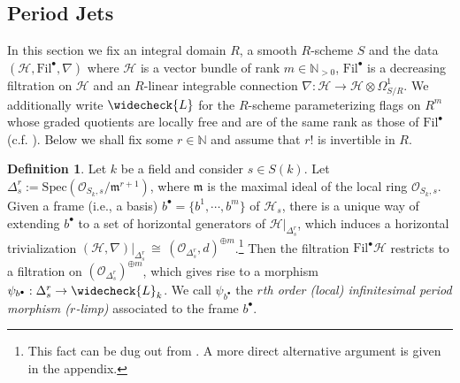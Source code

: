 \documentclass[letter, 11pt]{article}
\theoremstyle{plain}
\theoremstyle{definition}
\newtheorem{definition}[subsubsection]{Definition}
\newcommand{\IN}{\mathbb{N}}
\newcommand{\Spec}{\mathrm{Spec}}
\newcommand{\che}[1]{\widecheck{#1}}
\newcommand\iso{\,{\cong}\,}
\newcommand\tensor{{\otimes}}
\newcommand{\<}{\langle}
\renewcommand{\>}{\rangle}
\newcommand{\sH}{\mathcal{H}}
\newcommand{\sO}{\mathcal{O}}
\newcommand{\Fil}{\mathrm{Fil}}
\newcommand{\fm}{\mathfrak{m}}
\begin{document}
\subsection{Period Jets}
\label{sec: period jets}

In this section we fix an integral domain $R$, a smooth $R$-scheme $S$ and the data $(\sH, \Fil^{\bullet}, \nabla)$ where $\sH$ is a vector bundle of rank $m \in \IN_{> 0}$, $\Fil^\bullet$ is a decreasing filtration on $\sH$ and an $R$-linear integrable connection $\nabla : \sH \to \sH \tensor \Omega^1_{S/R}$. We additionally write $\che{L}$ for the $R$-scheme parameterizing flags on $R^{m}$ whose graded quotients are locally free and are of the same rank as those of $\Fil^{\bullet}$ (c.f. \cite[\S1.2]{urbanik2022algebraic}). Below we shall fix some $r \in \IN$ and assume that $r!$ is invertible in $R$.

\begin{definition}
\label{rlimpdef}
    Let $k$ be a field and consider $s \in S(k)$. Let $\Delta^r_s := \Spec(\sO_{S_k, s}/ \fm^{r + 1})$, where $\fm$ is the maximal ideal of the local ring $\sO_{S_k, s}$. Given a frame (i.e., a basis) $b^\bullet = \{ b^1, \cdots, b^m \}$ of $\sH_s$, there is a unique way of extending $b^\bullet$ to a set of horizontal generators of $\sH|_{\Delta^r_s}$, which induces a horizontal trivialization $(\sH, \nabla)|_{\Delta^r_s} \iso (\sO_{\Delta^r_s}, d)^{\oplus m}$.\footnote{This fact can be dug out from \cite[Lem.~2.6]{urbanik2022algebraic}. A more direct alternative argument is given in the appendix.} Then the filtration $\Fil^\bullet \sH$ restricts to a filtration on $(\sO_{\Delta^r_s})^{\oplus m}$, which gives rise to a morphism $\psi_{b^\bullet} : \Delta^r_s \to \che{L}_k$. We call $\psi_{b^\bullet}$ the \textit{$r$th order (local) infinitesimal period morphism ($r$-limp)} associated to the frame $b^\bullet$. 
\end{definition}  
\end{document}

